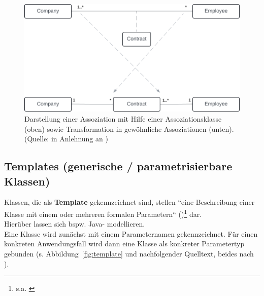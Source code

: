 \begin{figure}
    \centering
    \includegraphics[scale=0.4]{part three/Klassendiagramme - Erweiterte Konzepte und Paketdiagramme/img/assoziationsklasse}
    \caption{Darstellung einer Assoziation mit Hilfe einer Assoziationsklasse (oben) sowie Transformation in gewöhnliche Assoziationen (unten). (Quelle: in Anlehnung an \cite[279, Abb. 4.4-11]{Oes05})}
    \label{fig:assoziationsklasse}
\end{figure}

\subsection{Templates (generische / parametrisierbare Klassen)}
Klassen, die als \textbf{Template} gekennzeichnet sind, stellen ``eine Beschreibung einer Klasse mit einem oder mehreren formalen Parametern`` (\cite[253]{Bal05})\footnote{
s.a. \cite[103 ff.]{OMG17}
} dar.\\

\noindent
Hierüber lassen sich bspw. Java- modellieren.\\

\noindent
Eine Klasse wird zunächst mit einem Parameternamen gekennzeichnet.
Für einen konkreten Anwendungsfall wird dann eine Klasse als konkreter Parametertyp gebunden (s. Abbildung~\ref{fig:template} und nachfolgender Quelltext, beides nach \cite[81 f.]{Fow03b}).

